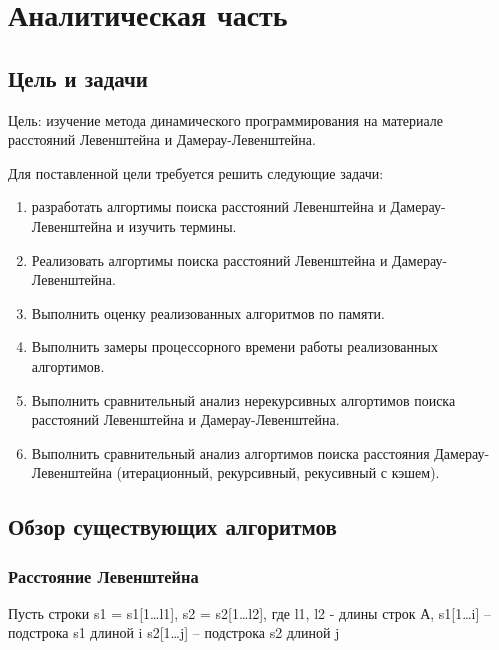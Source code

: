 \titleformat{\section}[hang]
{\bfseries\normalsize}{\thesection}{1em}{}
\titlespacing\section{\parindent}{\parskip}{\parskip}
\section{Аналитическая часть}

\subsection{Цель и задачи}

Цель: изучение метода динамического программирования на материале расстояний Левенштейна и Дамерау-Левенштейна.

Для поставленной цели требуется решить следующие задачи:

\begin{enumerate}[leftmargin=1.6\parindent]
	\item разработать алгортимы поиска расстояний Левенштейна и Дамерау-Левенштейна и изучить термины.
	\item Реализовать алгортимы поиска расстояний Левенштейна и Дамерау-Левенштейна.
	\item Выполнить оценку реализованных алгоритмов по памяти.
	\item Выполнить замеры процессорного времени работы реализованных алгортимов.
	\item Выполнить сравнительный анализ нерекурсивных алгортимов поиска расстояний Левенштейна и Дамерау-Левенштейна.
	\item Выполнить сравнительный анализ алгортимов поиска расстояния \newline Дамерау-Левенштейна (итерационный, рекурсивный, рекусивный с кэшем).
\end{enumerate}
\pagebreak
\subsection{Обзор существующих алгоритмов}

\subsubsection{Расстояние Левенштейна}
Пусть строки s1 = s1[1\dots l1], s2 = s2[1\dots l2], где\newline
l1, l2 - длины строк\newline
А, s1[1\dots i] -- подстрока s1 длиной i\newline
s2[1\dots j] -- подстрока s2 длиной j

